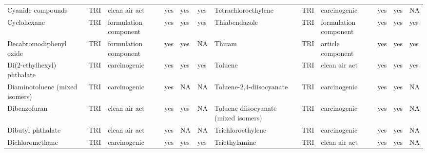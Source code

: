 \begin{table}[H]
{\begin{tabular}{llllllllllll}
            Cyanide compounds                                                          & TRI            & clean air act         & yes    & yes     & yes  & Tetrachloroethylene                                                                                                & TRI            & carcinogenic & yes & yes & NA\\
            Cyclohexane                                                                & TRI            & formulation component & yes    & yes     & yes  & Thiabendazole                                                                                                      & TRI            & formulation component & yes & yes & yes\\
            Decabromodiphenyl oxide                                                    & TRI            & formulation component & yes    & yes     & NA   & Thiram                                                                                                             & TRI            & article component & yes & yes & yes\\
            Di(2-ethylhexyl) phthalate                                                 & TRI            & carcinogenic          & yes    & yes     & yes  & Toluene                                                                                                            & TRI            & clean air act & yes & yes & yes\\
            Diaminotoluene (mixed isomers)                                             & TRI            & carcinogenic          & yes    & NA      & NA   & Toluene-2,4-diisocyanate & TRI & carcinogenic & yes & yes & NA\\
            Dibenzofuran                                                               & TRI            & clean air act         & yes    & yes     & NA   & Toluene diisocyanate (mixed isomers)                                                                               & TRI & carcinogenic & yes & yes & NA\\
            Dibutyl phthalate                                                          & TRI            & clean air act         & yes    & NA      & NA   & Trichloroethylene                                                                                                  & TRI            & carcinogenic & yes & yes & NA\\
            Dichloromethane                                                            & TRI            & carcinogenic          & yes    & yes     & yes  & Triethylamine                                                                                                      & TRI            & clean air act         & yes & yes & NA\\

\end{tabular}}
\end{table}

